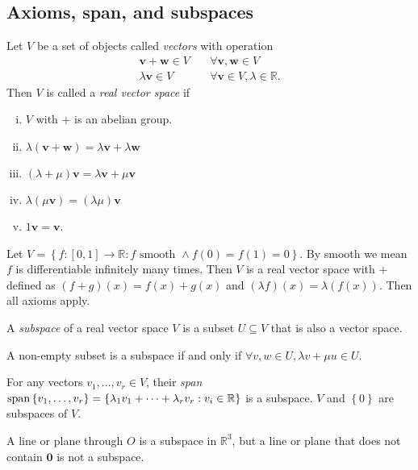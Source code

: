 \documentclass[10pt]{article}
\begin{document}
    \subsection{Axioms, span, and subspaces}
    \begin{definition}
        Let $V$ be a set of objects called \textit{vectors} with operation
        \[
            \begin{aligned}
                 \mathbf{v}+\mathbf{w}\in V&\quad \forall \mathbf{v},\mathbf{w}\in V\\
                 \lambda \mathbf{v}\in V&\quad \forall \mathbf{v}\in V, \lambda\in \mathbb{R}.
            \end{aligned}
        \]
        Then $V$ is called a \textit{real vector space} if 
        \begin{enumerate}[(i).]
            \item $V$ with $+$ is an abelian group.
            \item $ \lambda(\mathbf{v}+\mathbf{w})=\lambda \mathbf{v}+\lambda \mathbf{w} $
            \item $ (\lambda+\mu)\mathbf{v}=\lambda \mathbf{v}+\mu \mathbf{v} $
            \item $ \lambda(\mu \mathbf{v})=(\lambda \mu) \mathbf{v} $
            \item $ 1 \mathbf{v}=\mathbf{v} $.
        \end{enumerate}
    \end{definition}
    \begin{example}
        Let $ V=\left\{ f:[0,1] \to \mathbb{R} : f\text{ smooth } \land f(0)=f(1)=0\right\} $. By smooth we mean $f$ is differentiable infinitely many times. Then $V$ is a real vector space with $+$ defined as $ (f+g)(x)=f(x)+g(x) $ and $ (\lambda f)(x)=\lambda(f(x)) $. Then all axioms apply.
    \end{example}
    \begin{definition}
        A \textit{subspace} of a real vector space $V$ is a subset $U \subseteq V$ that is also a vector space. 
    \end{definition}
    \begin{remark}
        A non-empty subset is a subspace if and only if $ \forall v,w\in U, \lambda v+ \mu u\in U $.
    \end{remark}
    For any vectors $ v_1,\dots,v_r\in V $, their \textit{span} $ \operatorname{span}\left\{ v_1,\dots,v_r\right\}=\left\{ \lambda_1 v_1+\cdots+\lambda_r v_r:v_i\in \mathbb{R} \right\} $ is a subspace. $V$ and $ \left\{ 0\right\} $ are subspaces of $V$.
    \begin{example}
        A line or plane through $O$ is a subspace in $ \mathbb{R}^3 $, but a line or plane that does not contain $ \mathbf{0} $ is not a subspace.
    \end{example}
\end{document}
